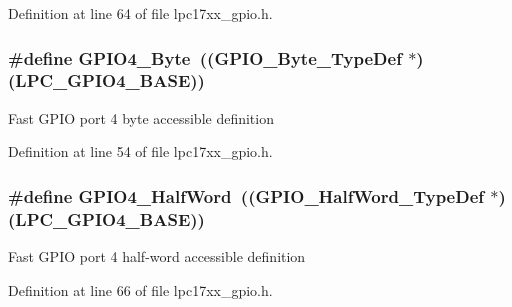 \-Definition at line 64 of file lpc17xx\-\_\-gpio.\-h.

\hypertarget{group___g_p_i_o___public___macros_ga528428e2906cb32a40f0e62a559f3814}{
\subsubsection[{\-G\-P\-I\-O4\-\_\-\-Byte}]{\setlength{\rightskip}{0pt plus 5cm}\#define {\bf \-G\-P\-I\-O4\-\_\-\-Byte}~(({\bf \-G\-P\-I\-O\-\_\-\-Byte\-\_\-\-Type\-Def} $\ast$)(\-L\-P\-C\-\_\-\-G\-P\-I\-O4\-\_\-\-B\-A\-S\-E))}}\label{group___g_p_i_o___public___macros_ga528428e2906cb32a40f0e62a559f3814}
\-Fast \-G\-P\-I\-O port 4 byte accessible definition 

\-Definition at line 54 of file lpc17xx\-\_\-gpio.\-h.

\hypertarget{group___g_p_i_o___public___macros_ga6b21ef2ef759ab3165ef5031014266b0}{
\subsubsection[{\-G\-P\-I\-O4\-\_\-\-Half\-Word}]{\setlength{\rightskip}{0pt plus 5cm}\#define {\bf \-G\-P\-I\-O4\-\_\-\-Half\-Word}~(({\bf \-G\-P\-I\-O\-\_\-\-Half\-Word\-\_\-\-Type\-Def} $\ast$)(\-L\-P\-C\-\_\-\-G\-P\-I\-O4\-\_\-\-B\-A\-S\-E))}}\label{group___g_p_i_o___public___macros_ga6b21ef2ef759ab3165ef5031014266b0}
\-Fast \-G\-P\-I\-O port 4 half-\/word accessible definition 

\-Definition at line 66 of file lpc17xx\-\_\-gpio.\-h.

